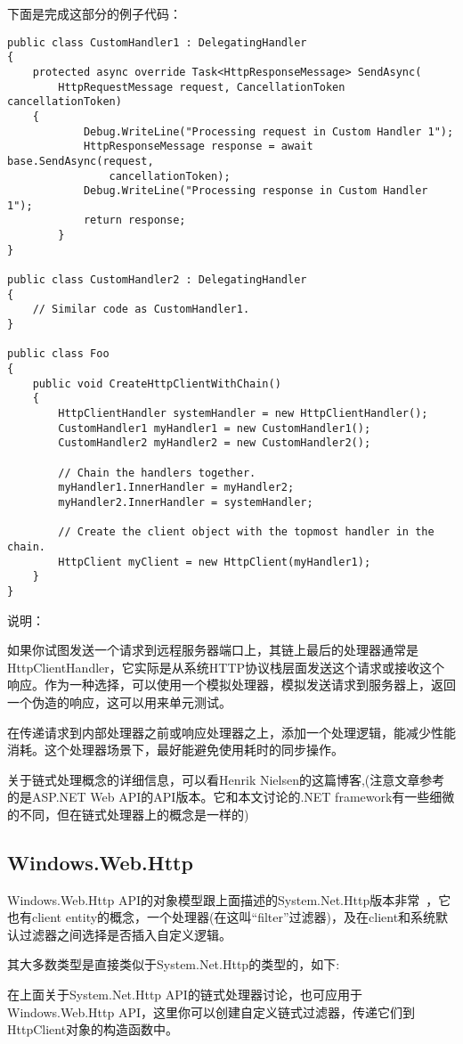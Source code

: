 \documentclass{ctexbook}
\begin{document}
下面是完成这部分的例子代码：

\begin{verbatim}
public class CustomHandler1 : DelegatingHandler
{
    protected async override Task<HttpResponseMessage> SendAsync(
        HttpRequestMessage request, CancellationToken cancellationToken)
    {
            Debug.WriteLine("Processing request in Custom Handler 1");
            HttpResponseMessage response = await base.SendAsync(request,
                cancellationToken);
            Debug.WriteLine("Processing response in Custom Handler 1");
            return response;
        }
}

public class CustomHandler2 : DelegatingHandler
{
    // Similar code as CustomHandler1.
}

public class Foo
{
    public void CreateHttpClientWithChain()
    {
        HttpClientHandler systemHandler = new HttpClientHandler();
        CustomHandler1 myHandler1 = new CustomHandler1();
        CustomHandler2 myHandler2 = new CustomHandler2();

        // Chain the handlers together.
        myHandler1.InnerHandler = myHandler2;
        myHandler2.InnerHandler = systemHandler;

        // Create the client object with the topmost handler in the chain.
        HttpClient myClient = new HttpClient(myHandler1);
    }
}
\end{verbatim}

说明：

如果你试图发送一个请求到远程服务器端口上，其链上最后的处理器通常是HttpClientHandler，它实际是从系统HTTP协议栈层面发送这个请求或接收这个响应。作为一种选择，可以使用一个模拟处理器，模拟发送请求到服务器上，返回一个伪造的响应，这可以用来单元测试。

在传递请求到内部处理器之前或响应处理器之上，添加一个处理逻辑，能减少性能消耗。这个处理器场景下，最好能避免使用耗时的同步操作。

关于链式处理概念的详细信息，可以看Henrik Nielsen的这篇博客,(注意文章参考的是ASP.NET Web API的API版本。它和本文讨论的.NET framework有一些细微的不同，但在链式处理器上的概念是一样的)

\subsection{Windows.Web.Http}
Windows.Web.Http API的对象模型跟上面描述的System.Net.Http版本非常 ，它也有client entity的概念，一个处理器(在这叫“filter”过滤器)，及在client和系统默认过滤器之间选择是否插入自定义逻辑。

其大多数类型是直接类似于System.Net.Http的类型的，如下:

在上面关于System.Net.Http API的链式处理器讨论，也可应用于Windows.Web.Http API，这里你可以创建自定义链式过滤器，传递它们到HttpClient对象的构造函数中。
	
	
	
%	
	
\end{document}
